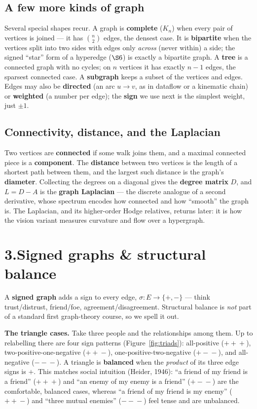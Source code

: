 \documentclass[10pt]{article}
\newcommand{\keyword}[1]{\textbf{\color{accent}#1}}
\begin{document}
\subsection*{A few more kinds of graph}
Several special shapes recur. A graph is \keyword{complete} ($K_n$) when every pair of vertices is joined --- it has $\binom{n}{2}$ edges, the densest case. It is \keyword{bipartite} when the vertices split into two sides with edges only \emph{across} (never within) a side; the signed ``star'' form of a hyperedge ($\S6$) is exactly a bipartite graph. A \keyword{tree} is a connected graph with no cycles; on $n$ vertices it has exactly $n-1$ edges, the sparsest connected case. A \keyword{subgraph} keeps a subset of the vertices and edges. Edges may also be \keyword{directed} (an arc $u\!\to\!v$, as in dataflow or a kinematic chain) or \keyword{weighted} (a number per edge); the \keyword{sign} we use next is the simplest weight, just $\pm1$.

\subsection*{Connectivity, distance, and the Laplacian}
Two vertices are \keyword{connected} if some walk joins them, and a maximal connected piece is a \keyword{component}. The \keyword{distance} between two vertices is the length of a shortest path between them, and the largest such distance is the graph's \keyword{diameter}. Collecting the degrees on a diagonal gives the \keyword{degree matrix} $D$, and $L=D-A$ is the \keyword{graph Laplacian} --- the discrete analogue of a second derivative, whose spectrum encodes how connected and how ``smooth'' the graph is. The Laplacian, and its higher-order Hodge relatives, returns later: it is how the vision variant measures curvature and flow over a hypergraph.

\section*{\color{accent}3.\quad Signed graphs \& structural balance}
A \keyword{signed graph} adds a sign to every edge, $\sigma:E\to\{+,-\}$ --- think trust/distrust, friend/foe, agreement/disagreement. Structural balance is \emph{not} part of a standard first graph-theory course, so we spell it out.

\textbf{The triangle cases.} Take three people and the relationships among them. Up to relabelling there are four sign patterns (Figure~\ref{fig:triads}): all-positive ($+\!+\!+$), two-positive-one-negative ($+\!+\!-$), one-positive-two-negative ($+\!-\!-$), and all-negative ($-\!-\!-$). A triangle is \keyword{balanced} when the \emph{product} of its three edge signs is $+$. This matches social intuition (Heider, 1946): ``a friend of my friend is a friend'' ($+\!+\!+$) and ``an enemy of my enemy is a friend'' ($+\!-\!-$) are the comfortable, balanced cases, whereas ``a friend of my friend is my enemy'' ($+\!+\!-$) and ``three mutual enemies'' ($-\!-\!-$) feel tense and are unbalanced.
\end{document}
